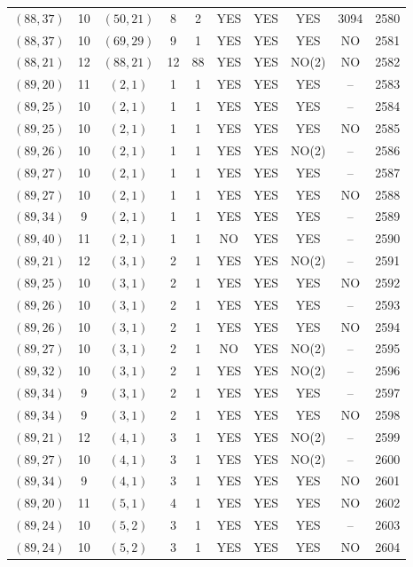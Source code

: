 \begin{longtable}{|c|c|c|c|c|c|c|c|c|c|}
$(88, 37)$ & 10 & $(50, 21)$ & 8 & 2 & YES & YES & YES & 3094 & 2580\\
$(88, 37)$ & 10 & $(69, 29)$ & 9 & 1 & YES & YES & YES & NO & 2581\\
$(88, 21)$ & 12 & $(88, 21)$ & 12 & 88 & YES & YES & NO(2) & NO & 2582\\
$(89, 20)$ & 11 & $(2, 1)$ & 1 & 1 & YES & YES & YES & -- & 2583\\
$(89, 25)$ & 10 & $(2, 1)$ & 1 & 1 & YES & YES & YES & -- & 2584\\
$(89, 25)$ & 10 & $(2, 1)$ & 1 & 1 & YES & YES & YES & NO & 2585\\
$(89, 26)$ & 10 & $(2, 1)$ & 1 & 1 & YES & YES & NO(2) & -- & 2586\\
$(89, 27)$ & 10 & $(2, 1)$ & 1 & 1 & YES & YES & YES & -- & 2587\\
$(89, 27)$ & 10 & $(2, 1)$ & 1 & 1 & YES & YES & YES & NO & 2588\\
$(89, 34)$ & 9 & $(2, 1)$ & 1 & 1 & YES & YES & YES & -- & 2589\\
$(89, 40)$ & 11 & $(2, 1)$ & 1 & 1 & NO & YES & YES & -- & 2590\\
$(89, 21)$ & 12 & $(3, 1)$ & 2 & 1 & YES & YES & NO(2) & -- & 2591\\
$(89, 25)$ & 10 & $(3, 1)$ & 2 & 1 & YES & YES & YES & NO & 2592\\
$(89, 26)$ & 10 & $(3, 1)$ & 2 & 1 & YES & YES & YES & -- & 2593\\
$(89, 26)$ & 10 & $(3, 1)$ & 2 & 1 & YES & YES & YES & NO & 2594\\
$(89, 27)$ & 10 & $(3, 1)$ & 2 & 1 & NO & YES & NO(2) & -- & 2595\\
$(89, 32)$ & 10 & $(3, 1)$ & 2 & 1 & YES & YES & NO(2) & -- & 2596\\
$(89, 34)$ & 9 & $(3, 1)$ & 2 & 1 & YES & YES & YES & -- & 2597\\
$(89, 34)$ & 9 & $(3, 1)$ & 2 & 1 & YES & YES & YES & NO & 2598\\
$(89, 21)$ & 12 & $(4, 1)$ & 3 & 1 & YES & YES & NO(2) & -- & 2599\\
$(89, 27)$ & 10 & $(4, 1)$ & 3 & 1 & YES & YES & NO(2) & -- & 2600\\
$(89, 34)$ & 9 & $(4, 1)$ & 3 & 1 & YES & YES & YES & NO & 2601\\
$(89, 20)$ & 11 & $(5, 1)$ & 4 & 1 & YES & YES & YES & NO & 2602\\
$(89, 24)$ & 10 & $(5, 2)$ & 3 & 1 & YES & YES & YES & -- & 2603\\
$(89, 24)$ & 10 & $(5, 2)$ & 3 & 1 & YES & YES & YES & NO & 2604\\

\end{longtable}
